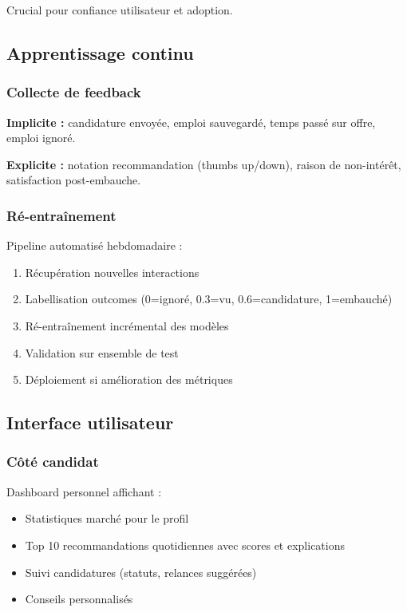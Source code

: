 \documentclass[12pt]{article}
\begin{document}
Crucial pour confiance utilisateur et adoption.

\subsection{Apprentissage continu}

\subsubsection{Collecte de feedback}

\textbf{Implicite :} candidature envoyée, emploi sauvegardé, temps passé sur offre, emploi ignoré.

\textbf{Explicite :} notation recommandation (thumbs up/down), raison de non-intérêt, satisfaction post-embauche.

\subsubsection{Ré-entraînement}

Pipeline automatisé hebdomadaire :
\begin{enumerate}
    \item Récupération nouvelles interactions
    \item Labellisation outcomes (0=ignoré, 0.3=vu, 0.6=candidature, 1=embauché)
    \item Ré-entraînement incrémental des modèles
    \item Validation sur ensemble de test
    \item Déploiement si amélioration des métriques
\end{enumerate}

\subsection{Interface utilisateur}

\subsubsection{Côté candidat}

Dashboard personnel affichant :
\begin{itemize}
    \item Statistiques marché pour le profil
    \item Top 10 recommandations quotidiennes avec scores et explications
    \item Suivi candidatures (statuts, relances suggérées)
    \item Conseils personnalisés
\end{itemize}
\end{document}
